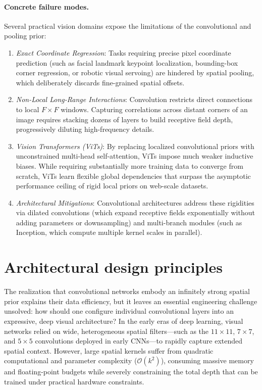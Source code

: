 \paragraph{Concrete failure modes.}
Several practical vision domains expose the limitations of the convolutional and pooling prior:
\begin{enumerate}[leftmargin=*]
  \item \textit{Exact Coordinate Regression}: Tasks requiring precise pixel coordinate prediction (such as facial landmark keypoint localization, bounding-box corner regression, or robotic visual servoing) are hindered by spatial pooling, which deliberately discards fine-grained spatial offsets.
  \item \textit{Non-Local Long-Range Interactions}: Convolution restricts direct connections to local $F \times F$ windows. Capturing correlations across distant corners of an image requires stacking dozens of layers to build receptive field depth, progressively diluting high-frequency details.
  \item \textit{Vision Transformers (ViTs)}: By replacing localized convolutional priors with unconstrained multi-head self-attention, ViTs impose much weaker inductive biases. While requiring substantially more training data to converge from scratch, ViTs learn flexible global dependencies that surpass the asymptotic performance ceiling of rigid local priors on web-scale datasets.
  \item \textit{Architectural Mitigations}: Convolutional architectures address these rigidities via dilated convolutions (which expand receptive fields exponentially without adding parameters or downsampling) and multi-branch modules (such as Inception, which compute multiple kernel scales in parallel).
\end{enumerate}


\section{Architectural design principles}
\label{sec:architectural_design_principles_cnns}

The realization that convolutional networks embody an infinitely strong spatial prior explains their data efficiency, but it leaves an essential engineering challenge unsolved: how should one configure individual convolutional layers into an expressive, deep visual architecture? In the early eras of deep learning, visual networks relied on wide, heterogeneous spatial filters---such as the $11 \times 11$, $7 \times 7$, and $5 \times 5$ convolutions deployed in early CNNs---to rapidly capture extended spatial context. However, large spatial kernels suffer from quadratic computational and parameter complexity ($\mathcal{O}(k^2)$), consuming massive memory and floating-point budgets while severely constraining the total depth that can be trained under practical hardware constraints.

